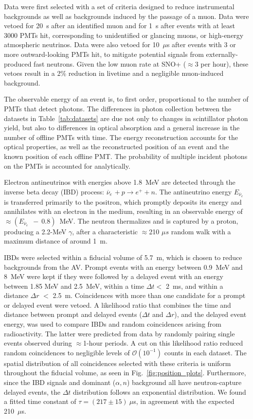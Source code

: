 \documentclass[%
 reprint,
superscriptaddress,
 amsmath,amssymb,
 aps,
]{revtex4-2}
\newcommand{\nuebar}{$\overline{\nu}_{e}$ }
\newcommand{\alphan}{($\alpha, n$) }
\begin{document}
Data were first selected with a set of criteria designed to reduce instrumental backgrounds as well as backgrounds induced by the passage of a muon.  
Data were vetoed for 20~s after an identified muon and for 1~s after events with at least 3000 PMTs hit, corresponding to unidentified or glancing muons, or high-energy atmospheric neutrinos.  Data were also vetoed for 10~$\mu$s after events with 3 or more outward-looking PMTs hit, to mitigate potential signals from externally-produced fast neutrons.  Given the low muon rate at SNO+ ($\approx$3 per hour), these vetoes result in a 2\% reduction in livetime and a negligible muon-induced background.  

The observable energy of an event is, to first order, proportional to the number of PMTs that detect photons.  
The differences in photon collection between the datasets in Table~\ref{tab:datasets} are due not only to changes in scintillator photon yield, but also to differences in optical absorption and a general increase in the number of offline PMTs with time.  
The energy reconstruction accounts for the optical properties, as well as the reconstructed position of an event and the known position of each offline PMT.  The probability of multiple incident photons on the PMTs is accounted for analytically. 

Electron antineutrinos with energies above 1.8~MeV are detected through the inverse beta decay (IBD) process: \nuebar$ +~p \to e^+ + n$. The antineutrino energy $E_{\text{\nuebar}}$ is transferred primarily to the positron, which promptly deposits its energy and annihilates with an electron in the medium, resulting in an observable energy of $\approx(E_{\text{\nuebar}}-~0.8)$~MeV.  The neutron thermalizes and is captured by a proton, producing a 2.2-MeV $\gamma$, after a characteristic $\approx$210 $\mu s$ random walk with a maximum distance of around 1~m. 

IBDs were selected within a fiducial volume of 5.7~m, which is chosen to reduce backgrounds from the AV. Prompt events with an energy between 0.9~MeV and 8~MeV were kept if they were followed by a delayed event with an energy between 1.85 MeV and 2.5~MeV, within a time $\Delta t <$ 2~ms, and within a distance $\Delta r$ $<$ 2.5~m.  Coincidences with more than one candidate for a prompt or delayed event were vetoed.  A likelihood ratio that combines the time and distance between prompt and delayed events ($\Delta t$ and $\Delta r$), and the delayed event energy, was used to compare IBDs and random coincidences arising from radioactivity.  The latter were predicted from data by randomly pairing single events observed during $\approx$1-hour periods. 
A cut on this likelihood ratio reduced random coincidences to negligible levels of $\mathcal{O}(10^{-1})$ counts in each dataset. 
The spatial distribution of all coincidences selected with these criteria is uniform throughout the fiducial volume, as seen in Fig.~\ref{fig:position_plots}.  
Furthermore, since the IBD signals and dominant \alphan background all have neutron-capture delayed events, the $\Delta t$ distribution follows an exponential distribution.  We found a fitted time constant of $\tau=(217\pm15)~\mu$s, in agreement with the expected 210~$\mu$s.  
\end{document}
